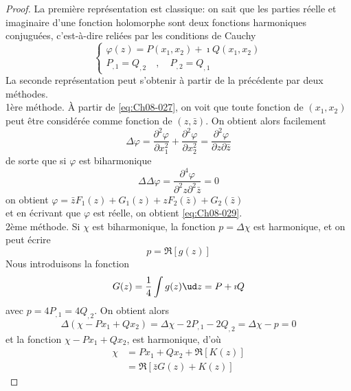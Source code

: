 \begin{proof}
La première représentation est classique: on sait que les parties réelle et imaginaire d'une fonction holomorphe sont deux fonctions harmoniques conjuguées, c'est-à-dire reliées par les conditions de Cauchy 
\begin{equation}
    \begin{cases}
        \varphi(z)=P(x_1,x_2)+\imath Q(x_1,x_2) \\
        P_{,1}=Q_{,2} \quad , \quad P_{,2}=Q_{,1}
    \end{cases}
    \label{eq:Ch08-030}
\end{equation}
La seconde représentation peut s'obtenir à partir de la précédente par deux méthodes. \\
1ère méthode. À partir de \eqref{eq:Ch08-027}, on voit que toute fonction de $(x_1,x_2)$ peut être considérée comme fonction de $(z,\bar{z})$. 
On obtient alors facilement 
\begin{equation*}
  \Delta \varphi = \frac{\partial^2\varphi}{\partial x_1^2} + \frac{\partial^2\varphi}{\partial x_2^2} = \frac{\partial^2\varphi}{\partial z \partial \bar{z}}
\end{equation*}
de sorte que si $\varphi$ est biharmonique
\begin{equation*}
  \Delta\Delta\varphi=\frac{\partial^4\varphi}{\partial^2 z \partial^2 \bar{z}}=0
\end{equation*}
on obtient $\varphi=\bar{z}F_1(z)+G_1(z)+zF_2(\bar{z})+G_2(\bar{z})$ \\
et en écrivant que $\varphi$ est réelle, on obtient \eqref{eq:Ch08-029}.\\
2ème méthode. Si $\chi$ est biharmonique, la fonction $p=\Delta\chi$ est harmonique, et on peut écrire 
\begin{equation*}
    p=\Re \left[ g(z)\right]
\end{equation*}
Nous introduisons la fonction 
\begin{equation*}
    G(z) = \frac{1}{4}\int g(z) \ud z = P + \imath Q
\end{equation*}
avec $p=4P_{,1}=4Q_{,2}$.
On obtient alors 
\begin{equation*}
    \Delta (\chi - Px_1 + Qx_2) = \Delta\chi - 2P_{,1} - 2Q_{,2} = \Delta\chi - p = 0
\end{equation*}
et la fonction $\chi - Px_1 + Qx_2$, est harmonique, d'où
\begin{equation*}
    \begin{aligned}
        \chi & = Px_1 + Qx_2 + \Re \left[ K(z)\right]\\
             & = \Re \left[ \bar{z}G(z) + K(z) \right]
    \end{aligned}
\end{equation*}
\end{proof}

